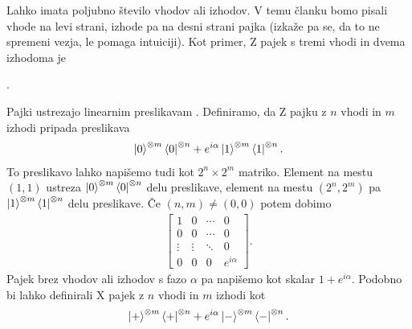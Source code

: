 \documentclass[mat1]{fmfdelo}
\begin{document}
Lahko imata poljubno število vhodov ali izhodov. V temu članku bomo pisali vhode na levi strani, izhode pa na desni strani pajka (izkaže pa se, da to ne spremeni vezja, le pomaga intuiciji). Kot primer, Z pajek s tremi vhodi in dvema izhodoma je
\begin{center}
  .
\end{center}
Pajki ustrezajo linearnim preslikavam \cite[poglavje 1.1]{Backens}. Definiramo, da Z pajku z \(n\) vhodi in \(m\) izhodi pripada preslikava
\begin{align*}
    \ket{0}^{\otimes m} \bra{0}^{\otimes n} + e^{i\alpha}\ket{1}^{\otimes m} \bra{1}^{\otimes n}.
\end{align*}
To preslikavo lahko napišemo tudi kot \(2^n\times 2^m\) matriko. Element na mestu \((1,1)\) ustreza \(\ket{0}^{\otimes m} \bra{0}^{\otimes n}\) delu preslikave, element na mestu \((2^n, 2^m)\) pa \(\ket{1}^{\otimes m} \bra{1}^{\otimes n}\) delu preslikave. Če \((n,m)\neq (0,0)\) potem dobimo
\begin{align*}
    \begin{bmatrix}
        1 & 0 & \cdots & 0 \\
        0 & 0 & \cdots & 0 \\
        \vdots & \vdots & \ddots & 0 \\
        0 & 0 & 0 & e^{i\alpha} 
        \end{bmatrix}.
\end{align*}
Pajek brez vhodov ali izhodov s fazo \(\alpha\) pa napišemo kot skalar \(1+e^{i\alpha}\).
Podobno bi lahko definirali X pajek z \(n\) vhodi in \(m\) izhodi \cite[Poglavje 3.1]{workingcs} kot
\begin{align*}
    \ket{+}^{\otimes m} \bra{+}^{\otimes n} + e^{i\alpha}\ket{-}^{\otimes m} \bra{-}^{\otimes n}.
\end{align*}
\end{document}
